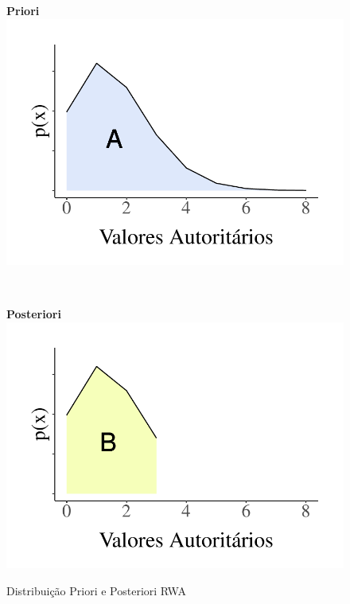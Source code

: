 \documentclass[
12pt,				%
openright,			%
twoside,			%
a4paper,			%
english,			%
french,				%
spanish,			%
brazil				%
]{abntex2}
\begin{document}
\begin{figure}[!htb]
	\caption{Distribuição Priori e Posteriori RWA}
	\centering
	\begin{minipage}[b]{0.4\textwidth}
		\textbf{Priori}
		\label{fig:rwa_area_total}
		\centering
		\includegraphics[width=1\linewidth]{figures/area_total_rwa}
			\end{minipage}
\\
	\hspace{.05\linewidth}
	\begin{minipage}[b]{0.4\textwidth}
		\textbf{Posteriori}
		\label{fig:rwa_area_min}
		\centering
		\includegraphics[width=1\linewidth]{figures/area_parcial_min_rwa}
		

\end{minipage}
\end{figure}
\end{document}
